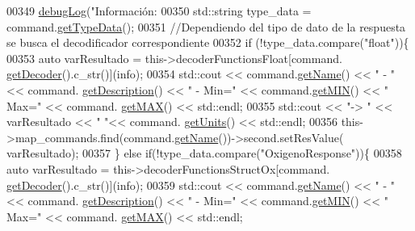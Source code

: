 \begin{DoxyCode}
{{{{{{{{{00349                                 \hyperlink{debug_8hpp_a55f41cf7b0585224496de3d7adbc101c}{debugLog}(\textcolor{stringliteral}{"Información: %
00350                                 std::string type\_data = command.\hyperlink{classCommands_a7d983e153465d335db0b3ad7724b8ef6}{getTypeData}();
00351                                 \textcolor{comment}{//Dependiendo del tipo de dato de la respuesta se busca el decodificador
       correspondiente}
00352                                 \textcolor{keywordflow}{if} (!type\_data.compare(\textcolor{stringliteral}{"float"}))\{
00353                                     \textcolor{keyword}{auto} varResultado = this->decoderFunctionsFloat[command.
      \hyperlink{classCommands_a8b4c2a655d8dd3de334338d6684d469c}{getDecoder}().c\_str()](info);
00354                                     std::cout << command.\hyperlink{classCommands_adf3d8a96310b1f4e57a6ecf0f2f153ea}{getName}() << \textcolor{stringliteral}{" - "} << command.
      \hyperlink{classCommands_ad82fe7dfcf1908423bdb59d048020e26}{getDescription}() << \textcolor{stringliteral}{" - Min="} << command.\hyperlink{classCommands_af0a1e2ea65b5a57997c721a8d77a1013}{getMIN}() << \textcolor{stringliteral}{" Max="} << command.
      \hyperlink{classCommands_afbad1051313d0cdecba276384cb7fc6b}{getMAX}() << std::endl;
00355                                     std::cout << \textcolor{stringliteral}{"-> "} << varResultado << \textcolor{stringliteral}{" "}<< command.
      \hyperlink{classCommands_ac67214a4fbd93fbb4d8ebb2dd815a3fa}{getUnits}() << std::endl;
00356                                     this->map\_commands.find(command.\hyperlink{classCommands_adf3d8a96310b1f4e57a6ecf0f2f153ea}{getName}())->second.setResValue(
      varResultado);
00357                                 \} \textcolor{keywordflow}{else} \textcolor{keywordflow}{if}(!type\_data.compare(\textcolor{stringliteral}{"OxigenoResponse"}))\{
00358                                     \textcolor{keyword}{auto} varResultado = this->decoderFunctionsStructOx[command.
      \hyperlink{classCommands_a8b4c2a655d8dd3de334338d6684d469c}{getDecoder}().c\_str()](info);
00359                                     std::cout << command.\hyperlink{classCommands_adf3d8a96310b1f4e57a6ecf0f2f153ea}{getName}() << \textcolor{stringliteral}{" - "} << command.
      \hyperlink{classCommands_ad82fe7dfcf1908423bdb59d048020e26}{getDescription}() << \textcolor{stringliteral}{" - Min="} << command.\hyperlink{classCommands_af0a1e2ea65b5a57997c721a8d77a1013}{getMIN}() << \textcolor{stringliteral}{" Max="} << command.
      \hyperlink{classCommands_afbad1051313d0cdecba276384cb7fc6b}{getMAX}() << std::endl;
}}}}}}}}}}
\end{DoxyCode}
